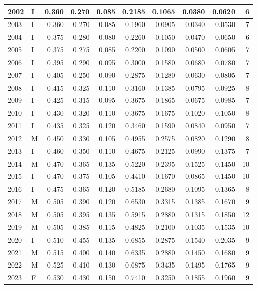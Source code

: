 \documentclass[9pt,twocolumn,twoside,]{pnas-new}
\begin{document}
\begin{tabular}{l|l|r|r|r|r|r|r|r|r}
\hline
2002 & I & 0.360 & 0.270 & 0.085 & 0.2185 & 0.1065 & 0.0380 & 0.0620 & 6\\
\hline
2003 & I & 0.360 & 0.270 & 0.085 & 0.1960 & 0.0905 & 0.0340 & 0.0530 & 7\\
\hline
2004 & I & 0.375 & 0.280 & 0.080 & 0.2260 & 0.1050 & 0.0470 & 0.0650 & 6\\
\hline
2005 & I & 0.375 & 0.275 & 0.085 & 0.2200 & 0.1090 & 0.0500 & 0.0605 & 7\\
\hline
2006 & I & 0.395 & 0.290 & 0.095 & 0.3000 & 0.1580 & 0.0680 & 0.0780 & 7\\
\hline
2007 & I & 0.405 & 0.250 & 0.090 & 0.2875 & 0.1280 & 0.0630 & 0.0805 & 7\\
\hline
2008 & I & 0.415 & 0.325 & 0.110 & 0.3160 & 0.1385 & 0.0795 & 0.0925 & 8\\
\hline
2009 & I & 0.425 & 0.315 & 0.095 & 0.3675 & 0.1865 & 0.0675 & 0.0985 & 7\\
\hline
2010 & I & 0.430 & 0.320 & 0.110 & 0.3675 & 0.1675 & 0.1020 & 0.1050 & 8\\
\hline
2011 & I & 0.435 & 0.325 & 0.120 & 0.3460 & 0.1590 & 0.0840 & 0.0950 & 7\\
\hline
2012 & M & 0.450 & 0.330 & 0.105 & 0.4955 & 0.2575 & 0.0820 & 0.1290 & 8\\
\hline
2013 & I & 0.460 & 0.350 & 0.110 & 0.4675 & 0.2125 & 0.0990 & 0.1375 & 7\\
\hline
2014 & M & 0.470 & 0.365 & 0.135 & 0.5220 & 0.2395 & 0.1525 & 0.1450 & 10\\
\hline
2015 & I & 0.470 & 0.375 & 0.105 & 0.4410 & 0.1670 & 0.0865 & 0.1450 & 10\\
\hline
2016 & I & 0.475 & 0.365 & 0.120 & 0.5185 & 0.2680 & 0.1095 & 0.1365 & 8\\
\hline
2017 & M & 0.505 & 0.390 & 0.120 & 0.6530 & 0.3315 & 0.1385 & 0.1670 & 9\\
\hline
2018 & M & 0.505 & 0.395 & 0.135 & 0.5915 & 0.2880 & 0.1315 & 0.1850 & 12\\
\hline
2019 & M & 0.505 & 0.385 & 0.115 & 0.4825 & 0.2100 & 0.1035 & 0.1535 & 10\\
\hline
2020 & I & 0.510 & 0.455 & 0.135 & 0.6855 & 0.2875 & 0.1540 & 0.2035 & 9\\
\hline
2021 & M & 0.515 & 0.400 & 0.140 & 0.6335 & 0.2880 & 0.1450 & 0.1680 & 9\\
\hline
2022 & M & 0.525 & 0.410 & 0.130 & 0.6875 & 0.3435 & 0.1495 & 0.1765 & 9\\
\hline
2023 & F & 0.530 & 0.430 & 0.150 & 0.7410 & 0.3250 & 0.1855 & 0.1960 & 9\\

\end{tabular}
\end{document}
